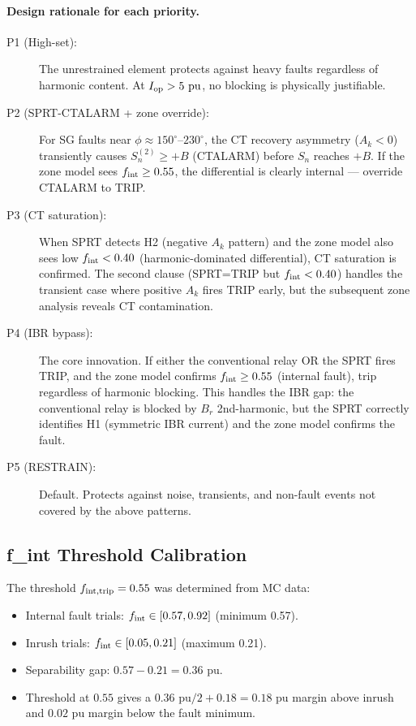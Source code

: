 \documentclass[11pt, a4paper]{article}
\newcommand{\pu}{\,\text{pu}}
\newcommand{\fint}{f_{\rm int}}
\newcommand{\Ak}{A_k}
\begin{document}
\paragraph{Design rationale for each priority.}

\begin{description}
  \item[P1 (High-set):]  The unrestrained element protects against heavy
    faults regardless of harmonic content.  At $I_{\rm op} > 5\,\pu$, no
    blocking is physically justifiable.

  \item[P2 (SPRT-CTALARM + zone override):]  For SG faults near
    $\phi \approx 150^\circ$--$230^\circ$, the CT recovery asymmetry ($\Ak < 0$)
    transiently causes $S_n^{(2)} \geq +B$ (CTALARM) before $S_n$ reaches
    $+B$.  If the zone model sees $\fint \geq 0.55$, the differential is
    clearly internal — override CTALARM to TRIP.

  \item[P3 (CT saturation):]  When SPRT detects H2 (negative $\Ak$ pattern)
    and the zone model also sees low $\fint < 0.40$ (harmonic-dominated
    differential), CT saturation is confirmed.  The second clause (SPRT=TRIP
    but $\fint < 0.40$) handles the transient case where positive $\Ak$ fires
    TRIP early, but the subsequent zone analysis reveals CT contamination.

  \item[P4 (IBR bypass):]  The core innovation.  If either the conventional
    relay OR the SPRT fires TRIP, and the zone model confirms $\fint \geq
    0.55$ (internal fault), trip regardless of harmonic blocking.  This
    handles the IBR gap: the conventional relay is blocked by $B_r$
    2nd-harmonic, but the SPRT correctly identifies H1 (symmetric IBR
    current) and the zone model confirms the fault.

  \item[P5 (RESTRAIN):]  Default.  Protects against noise, transients, and
    non-fault events not covered by the above patterns.
\end{description}

\subsection{f\_int Threshold Calibration}

The threshold $f_{{\rm int},{\rm trip}} = 0.55$ was determined from MC data:
\begin{itemize}
  \item Internal fault trials: $\fint \in [0.57, 0.92]$ (minimum 0.57).
  \item Inrush trials: $\fint \in [0.05, 0.21]$ (maximum 0.21).
  \item Separability gap: $0.57 - 0.21 = 0.36\,\pu$.
  \item Threshold at $0.55$ gives a $0.36\,\pu/2 + 0.18 = 0.18\,\pu$ margin
    above inrush and $0.02\,\pu$ margin below the fault minimum.
\end{itemize}
\end{document}
